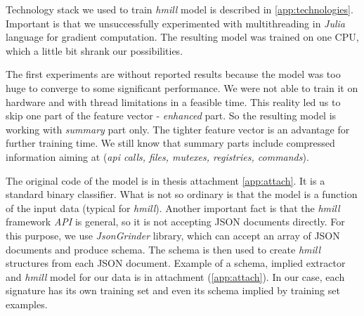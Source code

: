 
Technology stack we used to train \emph{hmill} model is described in \ref{app:technologies}. Important is that we unsuccessfully experimented with multithreading in \emph{Julia} language for gradient computation. The resulting model was trained on one CPU, which a little bit shrank our possibilities.

The first experiments are without reported results because the model was too huge to converge to some significant performance. We were not able to train it on hardware and with thread limitations in a feasible time. This reality led us to skip one part of the feature vector - \emph{enhanced} part. So the resulting model is working with \emph{summary} part only. The tighter feature vector is an advantage for further training time. We still know that summary parts include compressed information aiming at (\emph{api calls, files, mutexes, registries, commands}).

The original code of the model is in thesis attachment \ref{app:attach}. It is a standard binary classifier. What is not so ordinary is that the model is a function of the input data (typical for \emph{hmill}). Another important fact is that the \emph{hmill} framework \emph{API} is general, so it is not accepting JSON documents directly. For this purpose, we use \emph{JsonGrinder} library, which can accept an array of JSON documents and produce schema. The schema is then used to create \emph{hmill} structures from each JSON document. Example of a schema, implied extractor and \emph{hmill} model for our data is in attachment (\ref{app:attach}). In our case, each signature has its own training set and even its schema implied by training set examples.


